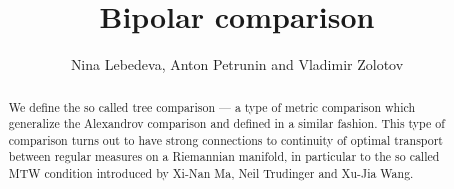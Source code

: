 \documentclass{article}
\begin{document}
\title{Bipolar comparison}
\author{Nina Lebedeva, Anton Petrunin and Vladimir Zolotov}


\newcommand{\Addresses}{{\bigskip\footnotesize
Anton Petrunin, \par\nopagebreak\textsc{Department of Mathematics, PSU, University Park, PA 16802, USA}
\par\nopagebreak
\textit{Email}: \texttt{petrunin@math.psu.edu}

\medskip
 
...
}}


\date{}

\maketitle

\begin{abstract}
We define the so called tree comparison --- a type of metric comparison which generalize the Alexandrov comparison and defined in a similar fashion.
This type of comparison turns out to have strong connections to continuity of optimal transport between regular measures on a Riemannian manifold, in particular to the so called MTW condition introduced by Xi-Nan Ma, Neil Trudinger and Xu-Jia Wang.

\end{abstract}








\end{document}
